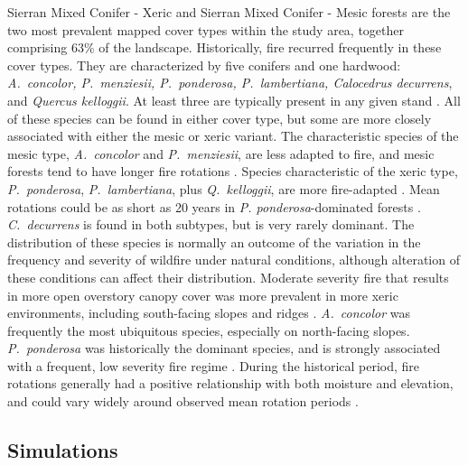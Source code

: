 Sierran Mixed Conifer - Xeric and Sierran Mixed Conifer - Mesic forests are the two most prevalent mapped cover types within the study area, together comprising 63\% of the landscape. Historically, fire recurred frequently in these cover types. They are characterized by five conifers and one hardwood: \emph{A.~concolor, P.~menziesii, P.~ponderosa, P.~lambertiana, Calocedrus decurrens}, and \emph{Quercus kelloggii}. At least three are typically present in any given stand \citep{Landfire2007}. All of these species can be found in either cover type, but some are more closely associated with either the mesic or xeric variant. The characteristic species of the mesic type, \emph{A.~concolor} and \emph{P.~menziesii}, are less adapted to fire, and mesic forests tend to have longer fire rotations \citep{Mallek2013}. Species characteristic of the xeric type, \emph{P.~ponderosa}, \emph{P.~lambertiana}, plus \emph{Q.~kelloggii}, are more fire-adapted \citep{Landfire2007}. Mean rotations could be as short as 20 years in \emph{P. ponderosa}-dominated forests \citep{Mallek2013}. \emph{C.~decurrens} is found in both subtypes, but is very rarely dominant. The distribution of these species is normally an outcome of the variation in the frequency and severity of wildfire under natural conditions, although alteration of these conditions can affect their distribution. Moderate severity fire that results in more open overstory canopy cover was more prevalent in more xeric environments, including south-facing slopes and ridges \citep{SNEP1996a,SNEP1996,Mallek2013,Safford2014}. \emph{A.~concolor} was frequently the most ubiquitous species, especially on north-facing slopes. \emph{P.~ponderosa} was historically the dominant species, and is strongly associated with a frequent, low severity fire regime \citep{WHR1988,Landfire2007}. During the historical period, fire rotations generally had a positive relationship with both moisture and elevation, and could vary widely around observed mean rotation periods \citep{Mallek2013}. 



\subsection*{Simulations}

